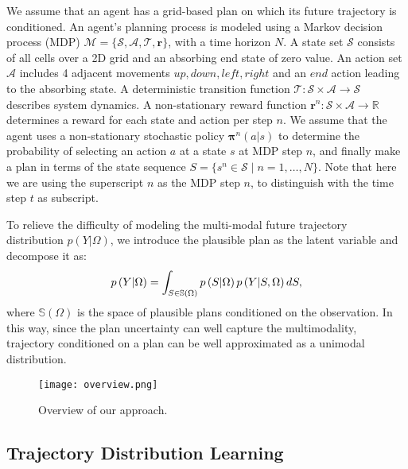 \documentclass[10pt,twocolumn,letterpaper]{article}
\begin{document}
We assume that an agent has a grid-based plan on which its future trajectory is conditioned. An agent's planning process is modeled using a Markov decision process (MDP) $\mathcal{M}=\{\mathcal{S}, \mathcal{A}, \mathcal{T}, \mathbf{r}\}$, with a time horizon $N$. A state set $\mathcal{S}$ consists of all cells over a 2D grid and an absorbing end state of zero value. An action set $\mathcal{A}$ includes 4 adjacent movements ${up, down, left, right}$ and an $end$ action leading to the absorbing state. A deterministic transition function $\mathcal{T}: \mathcal{S} \times \mathcal{A} \rightarrow \mathcal{S}$ describes system dynamics. A non-stationary reward function $\mathbf{r}^n:\mathcal{S} \times \mathcal{A} \rightarrow \mathbb{R}$ determines a reward for each state and action per step $n$. We assume that the agent uses a non-stationary stochastic policy $\boldsymbol{\pi}^n(a|s)$ to determine the probability of selecting an action $a$ at a state $s$ at MDP step $n$, and finally make a plan in terms of the state sequence $S=\{s^n \in \mathcal{S}\mid n=1,\dots,N\}$. Note that here we are using the superscript $n$ as the MDP step $n$, to distinguish with the time step $t$ as subscript.

To relieve the difficulty of modeling the multi-modal future trajectory distribution $p\left(Y|\Omega\right)$, we introduce the plausible plan as the latent variable and decompose it as:
\begin{equation}
p\left(Y|\Omega\right)=\int_{S \in \mathbb{S}(\Omega)} p\left(S|\Omega\right) p\left(Y|S, \Omega\right) d S,
\label{eq:decompose}
\notag
\end{equation}
where $\mathbb{S}(\Omega)$ is the space of plausible plans conditioned on the observation. In this way, since the plan uncertainty can well capture the multimodality, trajectory conditioned on a plan can be well approximated as a unimodal distribution.

\begin{figure*}[t]
	\centering
	\texttt{[image: overview.png]}
	\vspace{-0.7cm}
	\caption{Overview of our approach.}
	\vspace{-0.5cm}
	\label{fig:overview}
\end{figure*}

\subsection{Trajectory Distribution Learning}
\end{document}
